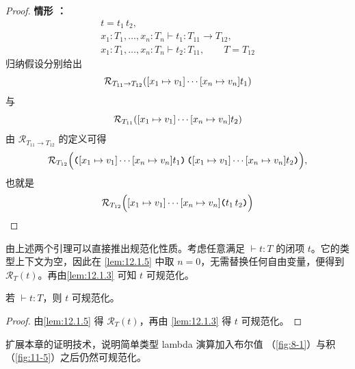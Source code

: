 \begin{proof}
\medskip\noindent
\textbf{情形 ：}
\[
\begin{gathered}
t=t_1\,t_2,\\
x_1:T_1,\ldots,x_n:T_n\vdash t_1:T_{11}\to T_{12},\\
x_1:T_1,\ldots,x_n:T_n\vdash t_2:T_{11},\qquad
T=T_{12}
\end{gathered}
\]
归纳假设分别给出
\[
\mathcal R_{T_{11}\to T_{12}}(
 [x_1\mapsto v_1]\cdots[x_n\mapsto v_n]t_1)
\]
与
\[
\mathcal R_{T_{11}}(
 [x_1\mapsto v_1]\cdots[x_n\mapsto v_n]t_2)
\]
由 \(\mathcal R_{T_{11}\to T_{12}}\) 的定义可得
\[
\mathcal R_{T_{12}}\Bigl(
 \mathopen{\text{\ttfamily\bfseries(}}
  [x_1\mapsto v_1]\cdots[x_n\mapsto v_n]t_1\mathclose{\text{\ttfamily\bfseries)}}\,
 \mathopen{\text{\ttfamily\bfseries(}}
  [x_1\mapsto v_1]\cdots[x_n\mapsto v_n]t_2\mathclose{\text{\ttfamily\bfseries)}}
\Bigr),
\]
也就是
\[
\mathcal R_{T_{12}}\Bigl(
 [x_1\mapsto v_1]\cdots
  [x_n\mapsto v_n]\mathopen{\text{\ttfamily\bfseries(}}t_1\,t_2\mathclose{\text{\ttfamily\bfseries)}}
\Bigr)
\]
\end{proof}

由上述两个引理可以直接推出规范化性质。考虑任意满足
\(\vdash t:T\) 的闭项 \(t\)。它的类型上下文为空，因此在
\cref{lem:12.1.5} 中取 \(n=0\)，无需替换任何自由变量，便得到
\(\mathcal R_T(t)\)。再由\cref{lem:12.1.3} 可知 \(t\) 可规范化。

\begin{theorem}[规范化]
\label{thm:12.1.6}
若 \(\vdash t:T\)，则 \(t\) 可规范化。
\end{theorem}

\begin{proof}
由\cref{lem:12.1.5} 得 \(\mathcal R_T(t)\)，再由
\cref{lem:12.1.3} 得 \(t\) 可规范化。
\end{proof}

\begin{exercise}
\label{ex:12.1.7}
扩展本章的证明技术，说明简单类型 lambda 演算加入布尔值
（\cref{fig:8-1}）与积（\cref{fig:11-5}）之后仍然可规范化。
\end{exercise}


